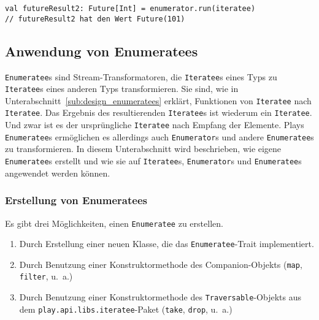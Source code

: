 \begin{lstlisting}[caption=Anwendung eines Enumerators mit gleichzeitiger Ergebnisextrahierung, label=lst:enumeratoranwendung3]
val futureResult2: Future[Int] = enumerator.run(iteratee)
// futureResult2 hat den Wert Future(101)
\end{lstlisting}




\subsection{Anwendung von Enumeratees} %
\label{sub:enumeratees}

\lstinline|Enumeratee|s sind Stream-Transformatoren, die \lstinline|Iteratee|s eines Typs zu \lstinline|Iteratee|s eines anderen Typs transformieren.
Sie sind, wie in Unterabschnitt~\ref{sub:design_enumeratees} erklärt, Funktionen von \lstinline|Iteratee| nach \lstinline|Iteratee|.
Das Ergebnis des resultierenden \lstinline|Iteratee|s ist wiederum ein \lstinline|Iteratee|.
Und zwar ist es der ursprüngliche \lstinline|Iteratee| nach Empfang der Elemente.
Plays \lstinline|Enumeratee|s ermöglichen es allerdings auch \lstinline|Enumerator|s und andere \lstinline|Enumeratee|s zu transformieren.
In diesem Unterabschnitt wird beschrieben, wie eigene \lstinline|Enumeratee|s erstellt und wie sie auf \lstinline|Iteratee|s, \lstinline|Enumerator|s und \lstinline|Enumeratee|s angewendet werden können.

\subsubsection{Erstellung von Enumeratees} %
\label{ssub:erstellung_von_enumeratees}

Es gibt drei Möglichkeiten, einen \lstinline|Enumeratee| zu erstellen.

\begin{enumerate}
  \item Durch Erstellung einer neuen Klasse, die das \lstinline|Enumeratee|-Trait implementiert.
  \item Durch Benutzung einer Konstruktormethode des Companion-Objekts (\lstinline|map|, \lstinline|filter|, u.~a.)
  \item Durch Benutzung einer Konstruktormethode des \lstinline|Traversable|-Objekts aus dem \lstinline|play.api.libs.iteratee|-Paket (\lstinline|take|, \lstinline|drop|, u.~a.)
\end{enumerate}

